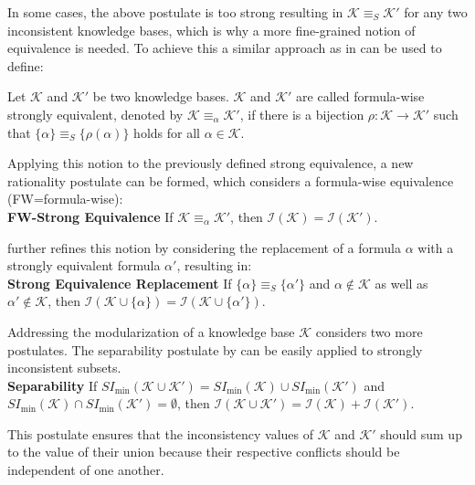 In some cases, the above postulate is too strong resulting in \(\mathcal{K} \equiv_S \mathcal{K}'\) for any two inconsistent knowledge bases, which is why a more fine-grained notion of equivalence is needed. To achieve this a similar approach as in \cite{thimm_inconsistency_2013} can be used to define:

\begin{definition}\label{def:fwequivalent}
    Let \(\mathcal{K}\) and \(\mathcal{K}'\) be two knowledge bases. \(\mathcal{K}\) and \(\mathcal{K}'\) are called formula-wise strongly equivalent, denoted by \(\mathcal{K} \equiv_{\alpha} \mathcal{K}'\), if there is a bijection \(\rho : \mathcal{K} \rightarrow \mathcal{K}'\) such that \(\{\alpha\} \equiv_S \{\rho(\alpha)\}\) holds for all \(\alpha \in \mathcal{K}\).
\end{definition}

Applying this notion to the previously defined strong equivalence, a new rationality postulate can be formed, which considers a formula-wise equivalence (FW=formula-wise):
\\
\textbf{FW-Strong Equivalence}
If \(\mathcal{K} \equiv_{\alpha} \mathcal{K}'\), then \(\mathcal{I}(\mathcal{K}) = \mathcal{I}(\mathcal{K}')\).

\cite{ulbricht_handling_2020} further refines this notion by considering the replacement of a formula \(\alpha\) with a strongly equivalent formula \(\alpha'\), resulting in:
\\
\textbf{Strong Equivalence Replacement}
If \(\{\alpha\} \equiv_S \{\alpha'\}\) and \(\alpha \notin \mathcal{K}\) as well as \(\alpha' \notin \mathcal{K}\), then \(\mathcal{I}(\mathcal{K} \cup \{\alpha\}) = \mathcal{I}(\mathcal{K} \cup \{\alpha'\})\).

Addressing the modularization of a knowledge base \(\mathcal{K}\) \cite{ulbricht_measuring_2018} considers two more postulates. The separability postulate by \cite{hunter_measure_2010} can be easily applied to strongly inconsistent subsets.
\\
\textbf{Separability}
If \(SI_{\min}(\mathcal{K} \cup \mathcal{K}') = SI_{\min}(\mathcal{K}) \cup SI_{\min}(\mathcal{K}')\) and \(SI_{\min}(\mathcal{K}) \cap SI_{\min}(\mathcal{K}') = \emptyset\), then \(\mathcal{I}(\mathcal{K} \cup \mathcal{K}') = \mathcal{I}(\mathcal{K}) + \mathcal{I}(\mathcal{K}')\).

This postulate ensures that the inconsistency values of \(\mathcal{K}\) and \(\mathcal{K}'\) should sum up to the value of their union because their respective conflicts should be independent of one another.

